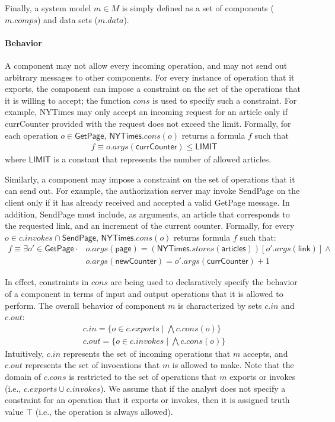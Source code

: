 Finally, a system model $m \in M$ is simply defined as a set of components
($m.comps$) and data sets ($m.data$). 

\paragraph{\textbf{Behavior}} A component may not allow every incoming
operation, and may not send out arbitrary messages to other
components. For every instance of operation that it exports, the
component can impose a constraint on the set of the operations that it
is willing to accept; the function $cons$ is used to specify such a
constraint. For example, \textsf{NYTimes} may only accept an incoming
request for an article only if \textsf{currCounter} provided with the
request does not exceed the limit. Formally, for each operation $o \in
\textsf{GetPage}$, $\textsf{NYTimes}.cons(o)$ returns a formula $f$
such that
\begin{align*}
f \equiv o.args(\textsf{currCounter}) \leq \textsf{LIMIT}
\end{align*}
where $\textsf{LIMIT}$ is a constant that represents the number of
allowed articles.

Similarly, a component may impose a constraint on the set of operations
that it can send out. For example, the authorization server may invoke
\textsf{SendPage} on the client only if it has already received and
accepted a valid \textsf{GetPage} message. In addition,
\textsf{SendPage} must include, as arguments, an article that
corresponds to the requested link, and an increment of the current
counter. Formally, for every $o \in c.invokes \cap \textsf{SendPage}$,
$\textsf{NYTimes}.cons(o)$ returns formula $f$ such that:
\begin{align*}
f \equiv \exists o' \in \textsf{GetPage} \cdot & o.args(\textsf{page}) =
(\textsf{NYTimes}.stores(\textsf{articles}))[o'.args(\textsf{link})]
\land \\
& o.args(\textsf{newCounter}) = o'.args(\textsf{currCounter}) + 1
\end{align*}

In effect, constraints in $cons$ are being used to
declaratively specify the behavior of a component in terms of input and
output operations that it is allowed to perform. The overall behavior
of component $m$ is characterized by sets $c.in$ and $c.out$:
\begin{align*}
c.in = \{ o \in c.exports \;|\; \bigwedge c.cons(o) \} \\
c.out = \{ o \in c.invokes \;|\; \bigwedge c.cons(o) \}
\end{align*}
Intuitively, $c.in$ represents the set of incoming operations that $m$
accepts, and $c.out$ represents the set of invocations that $m$ is
allowed to make. Note that the domain of $c.cons$ is restricted to
the set of operations that $m$ exports or invokes (i.e., $c.exports
\cup c.invokes$). We assume that if the analyst does not specify a
constraint for an operation that it exports or invokes,
then it is assigned truth value $\top$ (i.e., the operation is always
allowed).

%
